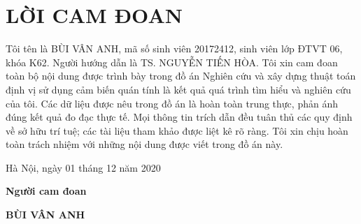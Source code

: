 \section*{LỜI CAM ĐOAN}
\thispagestyle{empty}
Tôi tên là BÙI VÂN ANH, mã số sinh viên 20172412, sinh viên lớp ĐTVT 06, khóa K62. Người hướng dẫn là TS. NGUYỄN TIẾN HÒA. Tôi xin cam đoan toàn bộ nội dung được trình bày trong đồ án Nghiên cứu và xây dựng thuật toán định vị sử dụng cảm biến quán tính là kết quả quá trình tìm hiểu và nghiên cứu của tôi. Các dữ liệu được nêu trong đồ án là hoàn toàn trung thực, phản ánh đúng kết quả đo đạc thực tế. Mọi thông tin trích dẫn đều tuân thủ các quy định về sở hữu trí tuệ; các tài liệu tham khảo được liệt kê rõ ràng. Tôi xin chịu hoàn toàn trách nhiệm với những nội dung được viết trong đồ án này.

\vspace{6pt}
\hspace{7cm}Hà Nội, ngày 01 tháng 12 năm 2020

\hspace{9cm}\textbf{Người cam đoan}

\vspace{2cm}
\hspace{9.25cm}\textbf{BÙI VÂN ANH}
\cleardoublepage
